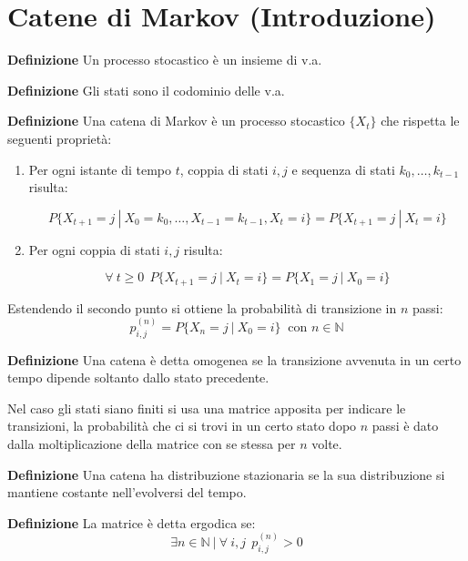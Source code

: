 \documentclass{article}
\begin{document}
\newpage

\section{Catene di Markov (Introduzione)}

\textbf{Definizione} Un processo stocastico è un insieme di v.a.\newline

\noindent\textbf{Definizione} Gli stati sono il codominio delle v.a.\newline

\noindent\textbf{Definizione} Una catena di Markov è un processo stocastico $\{X_t\}$ che rispetta le seguenti proprietà:
\begin{enumerate}
    \item Per ogni istante di tempo $t$, coppia di stati $i,j$ e sequenza di stati $k_0,\ldots,k_{t-1}$ risulta:

        $$P\{X_{t+1}=j\ |\ X_0=k_0,\ldots,X_{t-1}=k_{t-1},X_t=i\}=P\{X_{t+1}=j\ |\ X_t=i\}$$

    \item Per ogni coppia di stati $i,j$ risulta:

        $$\forall\ t\geq0\ \ P\{X_{t+1}=j\ |\ X_t=i\}=P\{X_1=j\ |\ X_0=i\}$$\newline
    
\end{enumerate}

\noindent Estendendo il secondo punto si ottiene la probabilità di transizione in $n$ passi:
$$p_{i,j}^{(n)}=P\{X_n=j\ |\ X_0=i\}\ \text{ con } n\in\mathbb{N}$$\newline

\noindent\textbf{Definizione} Una catena è detta omogenea se la transizione avvenuta in un certo tempo dipende soltanto dallo stato precedente.\newline

\noindent Nel caso gli stati siano finiti si usa una matrice apposita per indicare le transizioni, la probabilità che ci si trovi in un certo stato dopo $n$ passi è dato dalla moltiplicazione della matrice con se stessa per $n$ volte.\newline

\noindent\textbf{Definizione} Una catena ha distribuzione stazionaria se la sua distribuzione si mantiene costante nell'evolversi del tempo.\newline

\noindent\textbf{Definizione} La matrice è detta ergodica se:
$$\exists n\in\mathbb{N}\ |\ \forall\ i,j\ \ p_{i,j}^{(n)}>0$$
\end{document}
